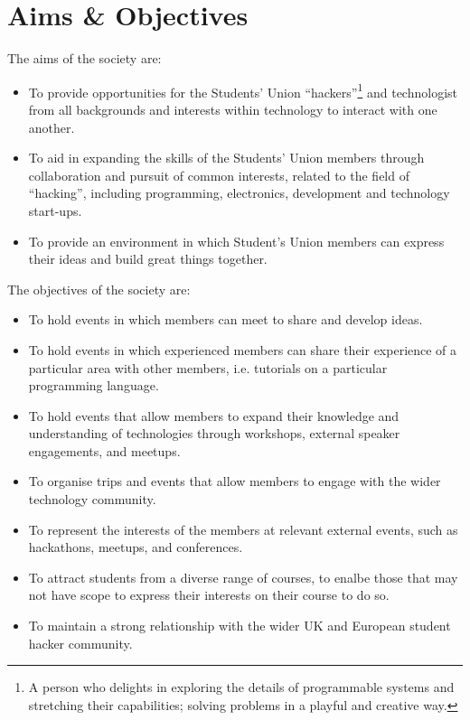 \section*{Aims \& Objectives}
\begin{clause}
The aims of the society are:
	\begin{itemize}
		\item To provide opportunities for the Students' Union ``hackers''\footnote{A person who delights in exploring the details of programmable systems and stretching their capabilities; solving problems in a playful and 		creative way.} and technologist from all backgrounds and interests within technology to interact with one another.
		\item To aid in expanding the skills of the Students' Union members through collaboration and pursuit of common interests, related to the field of ``hacking'', including programming, electronics, development and technology start-ups.
		\item To provide an environment in which Student's Union members can express their ideas and build great things together.
	\end{itemize}
\end{clause}
\begin{clause}
The objectives of the society are:
	\begin{itemize}
		\item To hold events in which members can meet to share and develop ideas.
		\item To hold events in which experienced members can share their experience of a particular area with other members, i.e. tutorials on a particular programming language.
		\item To hold events that allow members to expand their knowledge and understanding of technologies through workshops, external speaker engagements, and meetups.
		\item To organise trips and events that allow members to engage with the wider technology community.
		\item To represent the interests of the members at relevant external events, such as hackathons, meetups, and conferences.
		\item To attract students from a diverse range of courses, to enalbe those that may not have scope to express their interests on their course to do so.
		\item To maintain a strong relationship with the wider UK and European student hacker community.
	\end{itemize}
\end{clause}